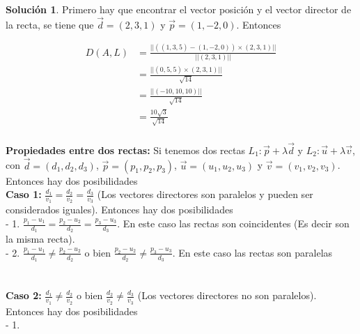 \documentclass{article}
\theoremstyle{plain}
\theoremstyle{definition}
\newtheorem{sol}[thm]{Solución}
\begin{document}
\begin{sol}Primero hay que encontrar el vector posición y el vector director de la recta, se tiene que $\overrightarrow{d}=(2,3,1)$ y  $\overrightarrow{p}=(1,-2,0)$. Entonces
\end{sol}

\begin{align*}
\displaystyle D(A,L) &= \frac{|| ((1,3,5)-(1,-2,0)) \times (2,3,1)||}{|| (2,3,1) ||} \\
 &= \frac{|| (0,5,5) \times (2,3,1)||}{\sqrt{14}} \\
  &= \frac{|| (-10,10,10)||}{\sqrt{14}} \\
    &= \frac{10\sqrt{3}}{\sqrt{14}} \\
\end{align*}



\textbf{Propiedades entre dos rectas:} Si tenemos dos rectas $L_1: \overrightarrow{p}+ \lambda \overrightarrow{d}$  y  $L_2: \overrightarrow{u}+ \lambda \overrightarrow{v}$, con $\overrightarrow{d}=(d_1,d_2,d_3)$, $\overrightarrow{p}=(p_1,p_2,p_3)$, $\overrightarrow{u}=(u_1,u_2,u_3)$ y $\overrightarrow{v}=(v_1,v_2,v_3)$. Entonces hay dos posibilidades  \\

\textbf{Caso 1: }  $\displaystyle \frac{d_1}{v_1}= \frac{d_2}{v_2} = \frac{d_3}{v_3}$ (Los vectores directores son paralelos y pueden ser considerados iguales). Entonces hay dos posibilidades \\

- 1. $\displaystyle \frac{p_1-u_1}{d_1}= \frac{p_2-u_2}{d_2} = \frac{p_3-u_3}{d_3}$. En este caso las rectas son coincidentes (Es decir son la misma recta). \\

- 2. $\displaystyle \frac{p_1-u_1}{d_1}\neq \frac{p_2-u_2}{d_2} $ o bien $\displaystyle  \frac{p_2-u_2}{d_2} \neq \frac{p_3-u_3}{d_3}$. En este caso las rectas son paralelas \\ \\ \\





\textbf{Caso 2: }  $\displaystyle \frac{d_1}{v_1} \neq \frac{d_2}{v_2}$ o bien $\displaystyle \frac{d_2}{v_2} \neq \frac{d_3}{v_3}$ (Los vectores directores  no son paralelos). Entonces hay dos posibilidades \\


- 1.
\end{document}
